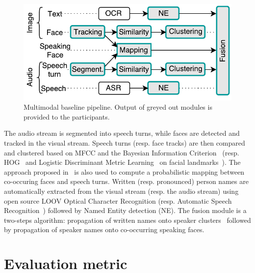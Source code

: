 \documentclass{acm_proc_article-me}
\begin{document}
\begin{figure}[htb]
 \centering
 \includegraphics[width=0.95\linewidth]{figs/baseline.pdf}
 \vspace{-0.6cm}
 \caption{Multimodal baseline pipeline. Output of greyed out modules is provided to the participants.}
 \label{fig:baseline}
\end{figure}

The audio stream is segmented into speech turns, while faces are detected and tracked in the visual stream.
Speech turns (resp. face tracks) are then compared and clustered based on MFCC and the Bayesian Information Criterion~\cite{CHEN--DARPA--1998} (resp. HOG~\cite{DALAL--CVPR--2005} and Logistic Discriminant Metric Learning~\cite{GUILLAUMIN--JCV--2012} on facial landmarks~\cite{URICAR--VISAPP--2012}). The approach proposed in~\cite{POIGNANT--MTAP--2015} is also used to compute a probabilistic mapping between co-occuring faces and speech turns. Written (resp. pronounced) person names are automatically extracted from the visual stream (resp. the audio stream) using open source LOOV Optical Character Recognition (resp. Automatic Speech Recognition~\cite{}) followed by Named Entity detection (NE). The fusion module is a two-steps algorithm: propagation of written names onto speaker clusters~\cite{POIGNANT--INTERSPEECH--2012} followed by propagation of speaker names onto co-occurring speaking faces.

\vspace{-0.1cm}
\section{Evaluation metric}
\label{sec:metric}
\end{document}
